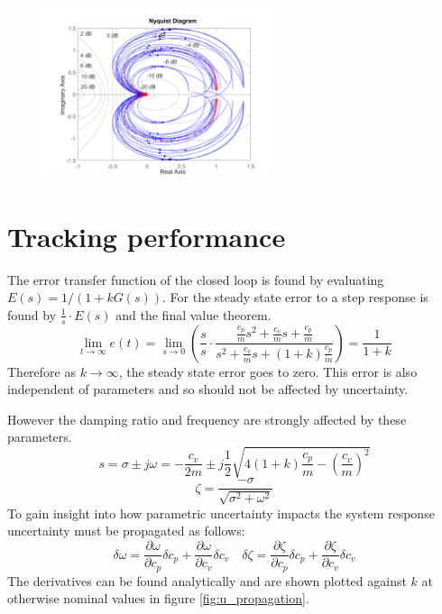 \documentclass{article}
\begin{document}
\begin{figure}[H]
    \centering
    \includegraphics[width=0.6\textwidth]{figures/nyquist_G.png}
    \caption{}
    \label{fig:nyquist_G}
\end{figure}

\section{Tracking performance}


The error transfer function of the closed loop is found by evaluating $E(s) = 1/(1+kG(s))$.
For the steady state error to a step response is found by $\frac{1}{s} \cdot E(s)$ and the final value theorem.
\begin{equation}
    \lim_{t \to \infty} e(t) = \lim_{s \to 0} \left( \frac{s}{s} \cdot \frac{\frac{c_p}{m}s^2 + \frac{c_v}{m}s + \frac{c_p}{m}}{s^2 + \frac{c_v}{m}s + (1+k)\frac{c_p}{m}} \right) = \frac{1}{1+k}
\end{equation}
Therefore as $k \to \infty$, the steady state error goes to zero.
This error is also independent of parameters and so should not be affected by uncertainty.

However the damping ratio and frequency are strongly affected by these parameters.
\begin{equation}
    s = \sigma \pm j\omega = -\frac{c_v}{2m} \pm j \frac{1}{2} \sqrt{4(1+k)\frac{c_p}{m} - \left(\frac{c_v}{m}\right)^2}
\end{equation}
\begin{equation}
    \zeta = \frac{-\sigma }{ \sqrt{\sigma^2 + \omega^2}}
\end{equation}
To gain insight into how parametric uncertainty impacts the system response uncertainty must be propagated as follows:
\begin{equation}
    \delta \omega = \frac{\partial \omega}{\partial c_p} \delta c_p + \frac{\partial \omega}{\partial c_v} \delta c_v \quad \delta \zeta = \frac{\partial \zeta}{\partial c_p} \delta c_p + \frac{\partial \zeta}{\partial c_v} \delta c_v
\end{equation}
The derivatives can be found analytically and are shown plotted against $k$ at otherwise nominal values in figure \ref{fig:u_propagation}.
\end{document}
